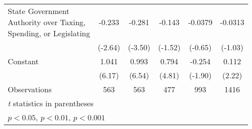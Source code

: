 {\begin{tabular*}{\linewidth}{@{\hskip\tabcolsep\extracolsep\fill}l*{5}{c}}
\addlinespace
State Government Authority over Taxing, Spending, or Legislating&   -0.233\sym{**} &   -0.281\sym{***}&   -0.143         &  -0.0379         &  -0.0313         \\
                &  (-2.64)         &  (-3.50)         &  (-1.52)         &  (-0.65)         &  (-1.03)         \\
\addlinespace
Constant        &    1.041\sym{***}&    0.993\sym{***}&    0.794\sym{***}&   -0.254         &    0.112\sym{*}  \\
                &   (6.17)         &   (6.54)         &   (4.81)         &  (-1.90)         &   (2.22)         \\
\midrule
Observations    &      563         &      563         &      477         &      993         &     1416         \\
\bottomrule
\multicolumn{6}{l}{\footnotesize \textit{t} statistics in parentheses}\\
\multicolumn{6}{l}{\footnotesize \sym{*} \(p<0.05\), \sym{**} \(p<0.01\), \sym{***} \(p<0.001\)}\\
\end{tabular*}
}
